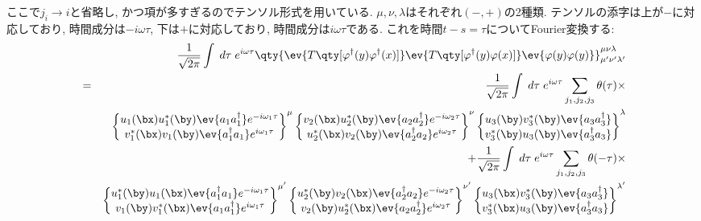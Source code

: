 \documentclass[10.5pt,a4paper]{jreport}
\begin{document}
ここで$j_i\rightarrow i$と省略し, かつ項が多すぎるのでテンソル形式を用いている. $\mu, \nu, \lambda$はそれぞれ$(-, +)$の2種類. テンソルの添字は上が$-$に対応しており, 時間成分は$-i\omega\tau$, 下は$+$に対応しており, 時間成分は$i\omega\tau$である.   これを時間$t-s = \tau$についてFourier変換する:
\begin{eqnarray}
  &&\frac{1}{\sqrt{2\pi}}\int\; d\tau\;e^{i\omega\tau}  \qty{\ev{T\qty[\varphi^\dagger(y)\varphi^\dagger(x)]}\ev{T\qty[\varphi^\dagger(y)\varphi(x)]}\ev{\varphi(y)\varphi(y)}}^{\mu\nu\lambda}_{\mu'\nu'\lambda'}\\
  \nonumber  &=& \frac{1}{\sqrt{2\pi}}\int\; d\tau\;e^{i\omega\tau}\sum_{j_1, j_2, j_3}\theta(\tau)\times\\
  \nonumber  &&\begin{Bmatrix}
    u_{1}(\bx)u_{1}^*(\by)\ev{a_{1}a_{1}^\dagger}e^{-i\omega_1\tau}\\
    v_{1}^*(\bx)v_{1}(\by)\ev{a_{1}^\dagger a_{1}}e^{i\omega_1\tau}
  \end{Bmatrix}^\mu
  \begin{Bmatrix}
    v_{2}(\bx)u^*_{2}(\by)\ev{a_{2}a_{2}^\dagger}e^{-i\omega_2\tau}\\
    u^*_{2}(\bx)v_{2}(\by)\ev{a_{2}^\dagger a_{2}}e^{i\omega_2\tau}
  \end{Bmatrix}^\nu
  \begin{Bmatrix}
    u_{3}(\by)v^*_{3}(\by)\ev{a_{3}a^\dagger_{3}}\\
    v_{3}^*(\by)u_{3}(\by)\ev{a_{3}^\dagger a_{3}}
  \end{Bmatrix}^\lambda\\
  \nonumber  &&+ \frac{1}{\sqrt{2\pi}}\int\; d\tau\;e^{i\omega\tau}\sum_{j_1, j_2, j_3}\theta(-\tau)\times\\
  \nonumber  &&\begin{Bmatrix}
    u_{1}^*(\by)u_{1}(\bx)\ev{a_{1}^\dagger a_{1}}e^{-i\omega_1\tau}\\
    v_{1}(\by)v_{1}^*(\bx)\ev{a_{1}a_{1}^\dagger}e^{i\omega_1\tau}
  \end{Bmatrix}^{\mu'}
  \begin{Bmatrix}
    u^*_{2}(\by)v_{2}(\bx)\ev{a_{2}^\dagger a_{2}}e^{-i\omega_2\tau}\\
    v_{2}(\by)u^*_{2}(\bx)\ev{a_{2}a_{2}^\dagger}e^{i\omega_2\tau}
  \end{Bmatrix}^{\nu'}
  \begin{Bmatrix}
    u_{3}(\bx)v^*_{3}(\by)\ev{a_{3}a^\dagger_{3}}\\
    v_{3}^*(\bx)u_{3}(\by)\ev{a_{3}^\dagger a_{3}}
  \end{Bmatrix}^{\lambda'}\\
\end{eqnarray}
\end{document}
